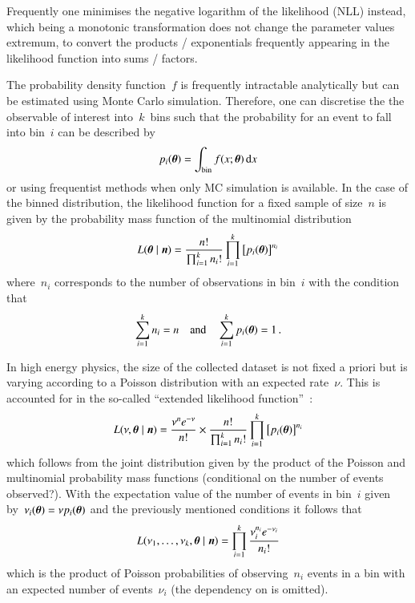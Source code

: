 Frequently one minimises the negative logarithm of the likelihood
(NLL) instead, which being a monotonic transformation does not change
the parameter values extremum, to convert the products / exponentials
frequently appearing in the likelihood function into sums / factors.

The probability density function~$f$ is frequently intractable
analytically but can be estimated using Monte Carlo
simulation. Therefore, one can discretise the the observable of
interest into~$k$~bins such that the probability for an event to fall
into bin~$i$ can be described by
\begin{align*}
  p_i(\boldtheta) = \int_\text{bin} f(x; \boldtheta) \, \mathrm{d}x
\end{align*}
or using frequentist methods when only MC simulation is available. In
the case of the binned distribution, the likelihood function for a
fixed sample of size~$n$ is given by the probability mass function of
the multinomial distribution
\begin{align*}
  L(\boldtheta \mid \boldn) = \frac{n!}{\prod_{i=1}^k n_i!} \prod_{i = 1}^k \left[ p_i(\boldtheta) \right]^{n_i}
\end{align*}
where~$n_i$ corresponds to the number of observations in bin~$i$ with
the condition that
\begin{align*}
  \sum_{i = 1}^k n_i = n \quad \text{and} \quad \sum_{i = 1}^k p_i(\boldtheta) = 1 \,\text{.}
\end{align*}

In high energy physics, the size of the collected dataset is not fixed
a priori but is varying according to a Poisson distribution with an
expected rate~$\nu$. This is accounted for in the so-called ``extended
likelihood function''~\cite{cowan1998}:
\begin{align*}
  L(\nu, \boldtheta \mid \boldn) =
  \frac{\nu^n e^{-\nu}}{n!} \times \frac{n!}
  {\prod_{i = 1}^k n_{i}!}
  \prod_{i = 1}^k \left[ p_i(\boldtheta) \right]^{n_i}
\end{align*}
which follows from the joint distribution given by the product of the
Poisson and multinomial probability mass functions (conditional on the
number of events observed?).  With the expectation value of the number
of events in bin~$i$ given
by~$\nu_i(\boldtheta) = \nu p_i(\boldtheta)$ and the previously
mentioned conditions it follows that
\begin{align*}
  L(\nu_1, \dots, \nu_k, \boldtheta \mid \boldn) = \prod_{i = 1}^k \frac{\nu_i^{n_i} e^{-\nu_i}}{n_i!}
\end{align*}
which is the product of Poisson probabilities of observing~$n_i$
events in a bin with an expected number of events~$\nu_i$ (the
dependency on \boldtheta is omitted).

